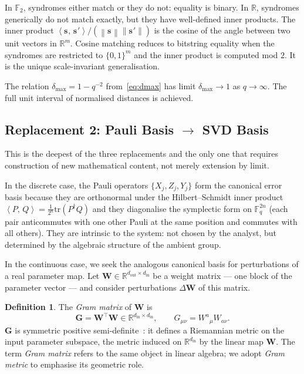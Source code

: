 \documentclass[11pt,a4paper]{article}
\theoremstyle{definition}
\newtheorem{definition}[theorem]{Definition}
\newcommand{\Wm}{\mathbf{W}}
\newcommand{\Gm}{\mathbf{G}}
\newcommand{\sk}[1][]{\mathbf{s}_{#1}}
\newcommand{\Rbb}{\mathbb{R}}
\newcommand{\Fbb}{\mathbb{F}}
\newcommand{\norm}[1]{\left\lVert#1\right\rVert}
\newcommand{\inner}[2]{\left\langle#1,\,#2\right\rangle}
\newcommand{\dimin}{d_{\mathrm{in}}}
\newcommand{\dimout}{d_{\mathrm{out}}}
\begin{document}
\begin{notebox}
In $\Fbb_2$, syndromes either match or they do not: equality is binary. In $\Rbb$, syndromes generically do not match exactly, but they have well-defined inner products. The inner product $\inner{\sk}{\sk'}/(\norm{\sk}\norm{\sk'})$ is the cosine of the angle between two unit vectors in $\Rbb^m$. Cosine matching reduces to bitstring equality when the syndromes are restricted to $\{0,1\}^m$ and the inner product is computed mod $2$. It is the unique scale-invariant generalisation.
\end{notebox}

The relation $\delta_{\max} = 1 - q^{-2}$ from~\eqref{eq:dmax} has limit $\delta_{\max}\to 1$ as $q\to\infty$. The full unit interval of normalised distances is achieved.

\subsection{Replacement 2: Pauli Basis \texorpdfstring{$\to$}{to} SVD Basis}
\label{sec:rep2}

This is the deepest of the three replacements and the only one that requires construction of new mathematical content, not merely extension by limit.

In the discrete case, the Pauli operators $\{X_j, Z_j, Y_j\}$ form the canonical error basis because they are orthonormal under the Hilbert--Schmidt inner product $\inner{P}{Q} = \frac{1}{2^n}\mathrm{tr}(P^\dagger Q)$ and they diagonalise the symplectic form on $\Fbb_q^{2n}$ (each pair anticommutes with one other Pauli at the same position and commutes with all others). They are intrinsic to the system: not chosen by the analyst, but determined by the algebraic structure of the ambient group.

In the continuous case, we seek the analogous canonical basis for perturbations of a real parameter map. Let $\Wm \in \Rbb^{\dimout \times \dimin}$ be a weight matrix --- one block of the parameter vector --- and consider perturbations $\Delta\Wm$ of this matrix.

\begin{defbox}
\begin{definition}
\label{def:gram}
The \emph{Gram matrix} of $\Wm$ is
\begin{equation}
  \Gm = \Wm^\top \Wm \in \Rbb^{\dimin\times\dimin},
  \qquad
  G_{\mu\nu} = W^a{}_\mu W_{a\nu}.
  \label{eq:gram}
\end{equation}
$\Gm$ is symmetric positive semi-definite~\cite{Horn2012}: it defines a Riemannian metric on the input parameter subspace, the metric induced on $\Rbb^{\dimin}$ by the linear map $\Wm$.
The term \emph{Gram matrix} refers to the same object in linear algebra; we adopt \emph{Gram metric} to emphasise its geometric role.
\end{definition}
\end{defbox}
\end{document}
